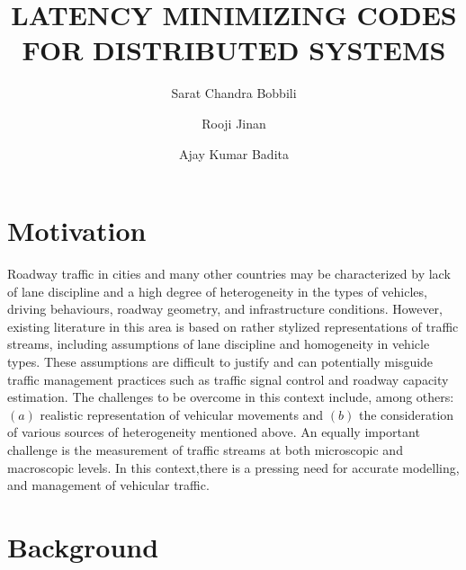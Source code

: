 \documentclass[a4paper,12pt]{scrartcl}
\date{}
\begin{document}
\title{LATENCY MINIMIZING CODES FOR  DISTRIBUTED SYSTEMS}
\author{
Sarat Chandra Bobbili\\
\and
Rooji Jinan\\
\and
Ajay Kumar Badita\\
}
\maketitle
\section*{Motivation}

Roadway traffic in cities and many other countries may be characterized by lack of lane discipline and a high degree of heterogeneity in the types of vehicles, driving behaviours, roadway geometry, and infrastructure conditions.
However, existing literature in this area is based on rather stylized representations of traffic streams, including assumptions of lane discipline and homogeneity in vehicle types.
These assumptions are difficult to justify and can potentially misguide traffic management practices such as traffic signal control and roadway capacity estimation.
The challenges to be overcome in this context include, among others: $(a)$ realistic representation of vehicular movements and $(b)$ the consideration of various sources of heterogeneity mentioned above.
An equally important challenge is the measurement of traffic streams at both microscopic and macroscopic levels.
In this context,there is a pressing need for accurate modelling, and management of vehicular traffic.


\section*{Background}
\end{document}
